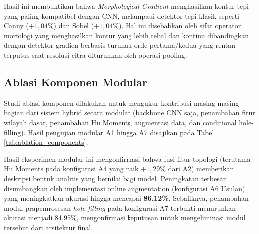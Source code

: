 \documentclass[journal]{IEEEtran}
\begin{document}
Hasil ini membuktikan bahwa \textit{Morphological Gradient} menghasilkan kontur tepi yang paling kompatibel dengan CNN, melampaui detektor tepi klasik seperti Canny ($+1{,}04\%$) dan Sobel ($+1{,}04\%$). Hal ini disebabkan oleh sifat operator morfologi yang menghasilkan kontur yang lebih tebal dan kontinu dibandingkan dengan detektor gradien berbasis turunan orde pertama/kedua yang rentan terputus saat resolusi citra diturunkan oleh operasi pooling.

\subsection{Ablasi Komponen Modular}
Studi ablasi komponen dilakukan untuk mengukur kontribusi masing-masing bagian dari sistem hybrid secara modular (backbone CNN saja, penambahan fitur wilayah dasar, penambahan Hu Moments, augmentasi data, dan conditional hole-filling). Hasil pengujian modular A1 hingga A7 disajikan pada Tabel \ref{tab:ablation_components}.

\begin{table}[htbp]
\caption{Hasil Studi Ablasi Komponen Modular}
\label{tab:ablation_components}
\begin{center}
\footnotesize
\setlength{\tabcolsep}{4pt}
\end{center}
\end{table}

Hasil eksperimen modular ini mengonfirmasi bahwa fusi fitur topologi (terutama Hu Moments pada konfigurasi A4 yang naik $+1{,}29\%$ dari A2) memberikan deskripsi bentuk analitis yang bernilai bagi model. Peningkatan terbesar disumbangkan oleh implementasi online augmentation (konfigurasi A6 Usulan) yang meningkatkan akurasi hingga mencapai \textbf{86,12\%}. Sebaliknya, penambahan modul prapemrosesan \textit{hole-filling} pada konfigurasi A7 terbukti menurunkan akurasi menjadi 84,95\%, mengonfirmasi keputusan untuk mengeliminasi modul tersebut dari arsitektur final.
\end{document}
